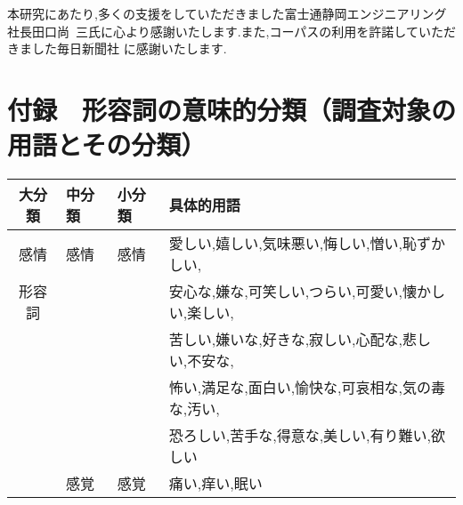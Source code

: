 本研究にあたり,多くの支援をしていただきました富士通静岡エンジニアリング\mbox{社長田口尚
三}氏に心より感謝いたします.また,コーパスの利用を許諾していただきました毎日新聞社
に感謝いたします.


\newpage
\section*{付録　形容詞の意味的分類（調査対象の用語とその分類）}

{\small
\begin{center}
\begin{tabular}{|c|l|l|l|} \hline
大分類 & 中分類 & 小分類 & 具体的用語 \\ \hline
感情   & 感情   & 感情   &
	愛しい,嬉しい,気味悪い,悔しい,憎い,恥ずかしい,\\
形容詞 & & &
	安心な,嫌な,可笑しい,つらい,可愛い,懐かしい,楽しい,\\
& & & 	苦しい,嫌いな,好きな,寂しい,心配な,悲しい,不安な,\\
& & & 	怖い,満足な,面白い,愉快な,可哀相な,気の毒な,汚い,\\
& & & 	恐ろしい,苦手な,得意な,美しい,有り難い,欲しい\\ \cline{2-4}
& 感覚 & 感覚 &
	痛い,痒い,眠い\\ \hline


\end{tabular}
\end{center}}
